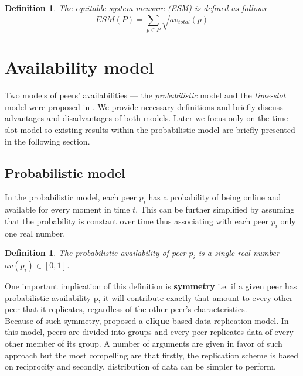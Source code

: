 \documentclass{pracamgren}
\newcounter{collective_ctr} \numberwithin{collective_ctr}{chapter}
\newtheorem{definition}[collective_ctr]{Definition}
\begin{document}
\begin{definition}
The {\it equitable system measure (ESM)} is defined as follows
$$ESM(P) = \sum_{p\in P} \sqrt{av_{total}(p)}$$
\end{definition}

\section{Availability model}\label{sect:ava}

Two models of peers' availabilities --- the {\it probabilistic} model and the {\it time-slot} model were proposed in \cite{krz}. We provide necessary definitions and briefly discuss advantages and disadvantages of both models. Later we focus only on the time-slot model so existing results within the probabilistic model are briefly presented in the following section.

\subsection{Probabilistic model}


In the probabilistic model, each peer $p_i$ has a probability of being online and available for every moment in time $t$. This can be further simplified by assuming that the probability is constant over time thus associating with each peer $p_i$ only one real number.

\begin{definition}
The {\it probabilistic availability} of peer $p_i$ is a single real number $av(p_i) \in [0,1]$.
\end{definition}

One important implication of this definition is {\bf symmetry} i.e. if a given peer has probabilistic availability p, it will contribute exactly that amount to every other peer that it replicates, regardless of the other peer's characteristics.\\

Because of such symmetry, \cite{krz} proposed a {\bf clique}-based data replication model. In this model, peers are divided into groups and every peer replicates data of every other member of its group. A number of arguments are given in favor of such approach but the most compelling are that firstly, the replication scheme is based on reciprocity and secondly, distribution of data can be simpler to perform.\\
\end{document}
